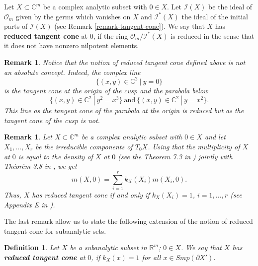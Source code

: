 \documentclass{amsart}
\newtheorem{definition}[theorem]{Definition}
\newtheorem{remark}[theorem]{Remark}
\newcommand{\R}{\mathbb{R}}
\newcommand{\C}{\mathbb{C}}
\begin{document}
Let $X\subset \C^m$ be a complex analytic subset with $0\in X$. Let $\mathcal{I}(X)$ be the ideal of $\mathcal{O}_m$ given by the germs which vanishes on $X$ and $\mathcal{I}^*(X)$ the ideal of the initial parts of $\mathcal{I}(X)$ (see Remark \ref{remark-tangent-cone}). We say that $X$ has {\bf reduced tangent cone} at $0$, if the ring $\mathcal{O}_m/\mathcal{I}^*(X)$ is reduced in the sense that it does not have nonzero nilpotent elements.

 \begin{remark}
 {\rm Notice that the notion of reduced tangent cone defined above is not an absolute concept. Indeed, the complex line
$$\{(x,y)\in\C^2 \ | \ y=0\}$$ is the tangent cone at the origin of the cusp and the parabola below
$$\{(x,y)\in\C^2 \ | \ y^2=x^3\} \ \mbox{and} \  \{(x,y)\in\C^2 \ | \ y=x^2\}.$$ 
This line as the tangent cone of the parabola at the origin is reduced but as the tangent cone of the cusp is not.}
 \end{remark}

\begin{remark}
{\rm Let $X\subset \C^m$ be a complex analytic subset with $0\in X$ and let $X_1,...,X_r$ be the irreducible components of $T_0X$. Using that the multiplicity of $X$ at $0$ is equal to the density of $X$ at $0$ (see the Theorem 7.3 in \cite{Draper:1969}) jointly with Th\'eor\`em 3.8 in \cite{Kurdyka:1989}, we get
$$
m(X,0)=\sum \limits_{i=1}^rk_X(X_i)m(X_i,0).
$$
Thus, $X$ has reduced tangent cone if and only if $k_X(X_i)=1$, $i=1,...,r$ (see Appendix E in \cite{Gau-Lipman:1983}).}
\end{remark}

The last remark allow us to state the following extension of the notion of reduced tangent cone for subanalytic sets.
\begin{definition}
 Let $X$ be a subanalytic subset in $\R^m$; $0\in X$.  We say that  $X$ has {\bf reduced tangent cone} at $0$, if $k_X(x)=1$ for all $x\in Smp(\partial X')$.
\end{definition}
\end{document}
